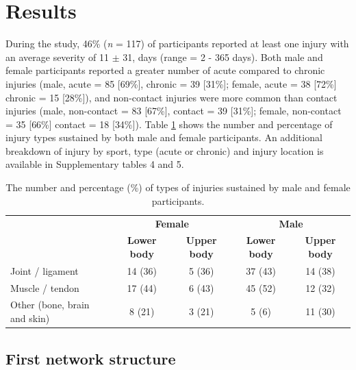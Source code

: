 \documentclass[
  english,
  man]{apa6}
\begin{document}
\hypertarget{results}{%
\section{Results}\label{results}}

During the study, 46\% (\emph{n} = 117) of participants reported at least one injury with an average severity of 11 \(\pm\) 31, days (range = 2 - 365 days).
Both male and female participants reported a greater number of acute compared to chronic injuries (male, acute = 85 {[}69\%{]}, chronic = 39 {[}31\%{]}; female, acute = 38 {[}72\%{]} chronic = 15 {[}28\%{]}), and non-contact injuries were more common than contact injuries (male, non-contact = 83 {[}67\%{]}, contact = 39 {[}31\%{]}; female, non-contact = 35 {[}66\%{]} contact = 18 {[}34\%{]}).
Table \ref{tab:table3} shows the number and percentage of injury types sustained by both male and female participants.
An additional breakdown of injury by sport, type (acute or chronic) and injury location is available in Supplementary tables 4 and 5.

\begin{table}[H]

\caption{\label{tab:table3}The number and percentage (\%) of types of injuries sustained by male and female participants.}
\centering
\begin{tabular}[t]{l|c|c|c|c}
\hline
\multicolumn{1}{c|}{\textbf{ }} & \multicolumn{2}{c|}{\textbf{Female}} & \multicolumn{2}{c}{\textbf{Male}} \\
\cline{2-3} \cline{4-5}
\textbf{} & \textbf{Lower body} & \textbf{Upper body} & \textbf{Lower body} & \textbf{Upper body}\\
\hline
Joint / ligament & 14 (36) & 5 (36) & 37 (43) & 14 (38)\\
\hline
Muscle / tendon & 17 (44) & 6 (43) & 45 (52) & 12 (32)\\
\hline
Other (bone, brain and skin) & 8 (21) & 3 (21) & 5 (6) & 11 (30)\\
\hline
\end{tabular}
\end{table}

\hypertarget{first-network-structure}{%
\subsection{First network structure}\label{first-network-structure}}
\end{document}
